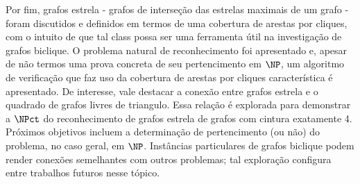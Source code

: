 Por fim, grafos estrela - grafos de interseção das estrelas maximais de um grafo - foram discutidos e definidos em termos de uma cobertura de arestas por cliques, com o intuito de que tal class possa ser uma ferramenta útil na investigação de grafos biclique.
O problema natural de reconhecimento foi apresentado e, apesar de não termos uma prova concreta de seu pertencimento em $\NP$, um algoritmo de verificação que faz uso da cobertura de arestas por cliques característica é apresentado.
De interesse, vale destacar a conexão entre grafos estrela e o quadrado de grafos livres de triangulo.
Essa relação é explorada para demonstrar a $\NPct$ do reconhecimento de grafos estrela de grafos com cintura exatamente 4.
Próximos objetivos incluem a determinação de pertencimento (ou não) do problema, no caso geral, em $\NP$.
Instâncias particulares de grafos biclique podem render conexões semelhantes com outros problemas; tal exploração configura entre trabalhos futuros nesse tópico.